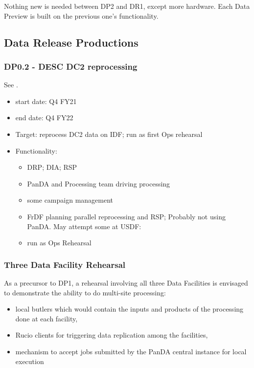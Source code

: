 Nothing new is needed between \gls{DP2} and \gls{DR1}, except more
hardware. Each Data Preview is built on the previous one's functionality.

\subsection{Data \gls{Release} Productions}
\subsubsection{ \gls{DP0}.2 - \gls{DESC} DC2 reprocessing}
See .
\begin{itemize}
\item start date: Q4 \gls{FY21}
\item end date: Q4 \gls{FY22}
\item Target: reprocess \gls{DC2} data on \gls{IDF}; run as first Ops rehearsal
\item Functionality:
\begin{itemize}
\item \gls{DRP}; \gls{DIA}; \gls{RSP}
\item \gls{PanDA} and Processing team driving processing
\item some campaign management
\item \gls{FrDF} planning parallel reprocessing and RSP; Probably not using
  \gls{PanDA}. May attempt some at \gls{USDF}:
\item run as Ops Rehearsal
\end{itemize}
\end{itemize}
\subsubsection{ Three Data Facility Rehearsal}
 As a precursor to DP1, a rehearsal involving all three Data
 Facilities is envisaged to demonstrate the ability to do multi-site
 processing:
 \begin{itemize}
\item local butlers which would contain the inputs and products of the processing done at each facility,
\item Rucio clients for triggering data replication among the facilities,
\item mechanism to accept jobs submitted by the PanDA
central instance for local execution
\end{itemize}
